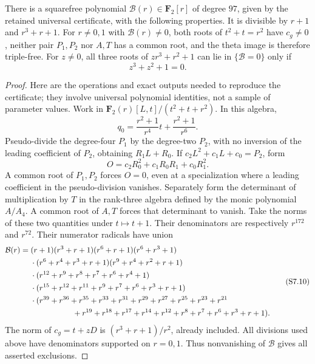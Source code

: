 \begin{lemma}
\label{lem:uniform-seven-parameter-certificate-candidate}
There is a squarefree polynomial $\mathcal B(r)\in\mathbf F_2[r]$
of degree $97$, given by the retained universal certificate, with
the following properties. It is divisible by $r+1$ and
$r^3+r+1$. For $r\ne0,1$ with $\mathcal B(r)\ne0$, both roots
of $t^2+t=r^2$ have $c_g\ne0$, neither pair $P_1,P_2$ nor $A,T$
has a common root, and the theta image is therefore triple-free.
For $z\ne0$, all three roots of $zr^3+r^2+1$ can lie in
$\{\mathcal B=0\}$ only if
\[
                         z^3+z^2+1=0.           \tag{S7.9}
\]
\end{lemma}

\begin{proof}
Here are the operations and exact outputs needed to reproduce the
certificate; they involve universal polynomial identities, not a
sample of parameter values. Work in
$\mathbf F_2(r)[L,t]/(t^2+t+r^2)$. In this algebra,
\[
 q_0=\frac{r^2+1}{r^4}t+\frac{r^2+1}{r^6}.
\]
Pseudo-divide the degree-four $P_1$ by the degree-two $P_2$, with
no inversion of the leading coefficient of $P_2$, obtaining
$R_1L+R_0$. If $c_2L^2+c_1L+c_0=P_2$, form
\[
 O=c_2R_0^2+c_1R_0R_1+c_0R_1^2.
\]
A common root of $P_1,P_2$ forces $O=0$, even at a specialization
where a leading coefficient in the pseudo-division vanishes.
Separately form the determinant of multiplication by $T$ in the
rank-three algebra defined by the monic polynomial $A/A_4$.
A common root of $A,T$ forces that determinant to vanish. Take the
norms of these two quantities under $t\mapsto t+1$.
Their denominators are respectively $r^{172}$ and $r^{72}$.
Their numerator radicals have union
\[
\begin{aligned}
\mathcal B(r)={}&(r+1)(r^3+r+1)(r^6+r+1)(r^6+r^3+1)\\
 &\cdot(r^6+r^4+r^3+r+1)(r^9+r^4+r^2+r+1)\\
 &\cdot(r^{12}+r^9+r^8+r^7+r^6+r^4+1)\\
 &\cdot(r^{15}+r^{12}+r^{11}+r^9+r^7+r^6+r^3+r+1)\\
 &\cdot(r^{39}+r^{36}+r^{35}+r^{33}+r^{31}+r^{29}
       +r^{27}+r^{25}+r^{23}+r^{21}\\
 &\hspace{19mm}+r^{19}+r^{18}+r^{17}+r^{14}+r^{12}
       +r^8+r^7+r^6+r^3+r+1).
\end{aligned}                                                     \tag{S7.10}
\]
The norm of $c_g=t+zD$ is $(r^3+r+1)/r^2$, already included.
All divisions used above have denominators supported on $r=0,1$.
Thus nonvanishing of $\mathcal B$ gives all asserted exclusions.


\end{proof}
